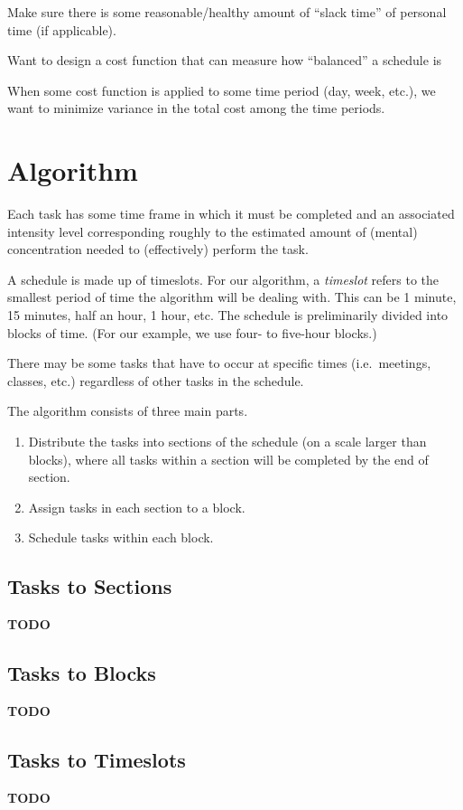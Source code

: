 \documentclass{article}
\newcommand{\todo}[1]{{\bf TODO #1}\\}
\begin{document}
	Make sure there is some reasonable/healthy amount of ``slack time'' of personal time (if applicable).

	Want to design a cost function that can measure how ``balanced'' a schedule is

	When some cost function is applied to some time period (day, week, etc.), we want to minimize variance in the total cost among the time periods.

\newpage
\section{Algorithm}
	Each task has some time frame in which it must be completed and an associated intensity level corresponding roughly to the estimated amount of (mental) concentration needed to (effectively) perform the task. 

	A schedule is made up of timeslots. For our algorithm, a \emph{timeslot} refers to the smallest period of time the algorithm will be dealing with. This can be 1 minute, 15 minutes, half an hour, 1 hour, etc.
	The schedule is preliminarily divided into blocks of time.
	(For our example, we use four- to five-hour blocks.)

	There may be some tasks that have to occur at specific times (i.e.~meetings, classes, etc.) regardless of other tasks in the schedule.

	The algorithm consists of three main parts.
	\begin{enumerate}
		\item Distribute the tasks into sections of the schedule (on a scale larger than blocks), where all tasks within a section will be completed by the end of section.
		\item Assign tasks in each section to a block. 
		\item Schedule tasks within each block.
	\end{enumerate}

\newpage
\subsection{Tasks to Sections}
\todo{}
\vspace{2.5in}

\subsection{Tasks to Blocks}
\todo{}
\vspace{2.5in}
\subsection{Tasks to Timeslots}
\todo{}
\end{document}
